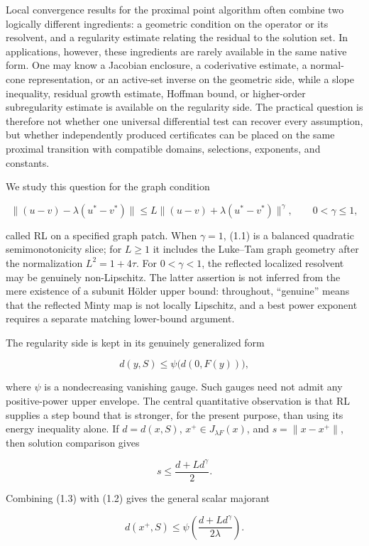 \documentclass[11pt,a4paper]{article}
\theoremstyle{plain}
\theoremstyle{definition}
\theoremstyle{remark}
\begin{document}
Local convergence results for the proximal point algorithm often combine
two logically different ingredients: a geometric condition on the
operator or its resolvent, and a regularity estimate relating the
residual to the solution set. In applications, however, these
ingredients are rarely available in the same native form. One may know a
Jacobian enclosure, a coderivative estimate, a normal-cone
representation, or an active-set inverse on the geometric side, while a
slope inequality, residual growth estimate, Hoffman bound, or
higher-order subregularity estimate is available on the regularity side.
The practical question is therefore not whether one universal
differential test can recover every assumption, but whether
independently produced certificates can be placed on the same proximal
transition with compatible domains, selections, exponents, and
constants.

We study this question for the graph condition

\[
\|(u-v)-\lambda(u^*-v^*)\|
\le L\|(u-v)+\lambda(u^*-v^*)\|^\gamma,
\qquad 0<\gamma\le1,
\tag{1.1}
\]

called RL on a specified graph patch. When \(\gamma=1\), (1.1) is a
balanced quadratic semimonotonicity slice; for \(L\ge1\) it includes the
Luke--Tam graph geometry after the normalization \(L^2=1+4\tau\). For
\(0<\gamma<1\), the reflected localized resolvent may be genuinely
non-Lipschitz. The latter assertion is not inferred from the mere
existence of a subunit Hölder upper bound: throughout, ``genuine'' means
that the reflected Minty map is not locally Lipschitz, and a best power
exponent requires a separate matching lower-bound argument.

The regularity side is kept in its genuinely generalized form

\[
d(y,S)\le \psi\bigl(d(0,F(y))\bigr),
\tag{1.2}
\]

where \(\psi\) is a nondecreasing vanishing gauge. Such gauges need not
admit any positive-power upper envelope. The central quantitative
observation is that RL supplies a step bound that is stronger, for the
present purpose, than using its energy inequality alone. If
\(d=d(x,S)\), \(x^+\in J_{\lambda F}(x)\), and \(s=\|x-x^+\|\), then
solution comparison gives

\[
s\le \frac{d+Ld^\gamma}{2}.
\tag{1.3}
\]

Combining (1.3) with (1.2) gives the general scalar majorant

\[
d(x^+,S)\le
\psi\!\left(\frac{d+Ld^\gamma}{2\lambda}\right).
\tag{1.4}
\]
\end{document}
